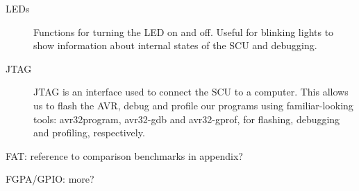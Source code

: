 \begin{description}
\item[LEDs] Functions for turning the LED on and off. Useful for blinking
  lights to show information about internal states of the SCU and debugging.
  
\item[JTAG] JTAG is an interface used to connect the SCU to a
  computer. This allows us to flash the AVR, debug and profile our programs
  using familiar-looking tools: avr32program, avr32-gdb and avr32-gprof, for
  flashing, debugging and profiling, respectively.
\end{description}

{\color{red}

FAT: reference to comparison benchmarks in appendix?

FGPA/GPIO: more?

}
